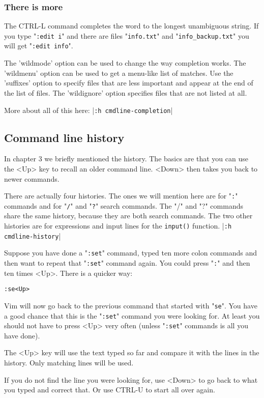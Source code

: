 \subsubsection{There is more}
The CTRL-L command completes the word to the longest unambiguous string.
If you type "\verb!:edit i!" and there are files "\verb!info.txt!" and "\verb!info_backup.txt!" you will get "\verb!:edit info!".

The 'wildmode' option can be used to change the way completion works.
The 'wildmenu' option can be used to get a menu-like list of matches.
Use the 'suffixes' option to specify files that are less important and appear at the end of the list of files.
The 'wildignore' option specifies files that are not listed at all.

More about all of this here: |\verb!:h cmdline-completion!|
\subsection{Command line history}
In chapter 3 we briefly mentioned the history.
The basics are that you can use the <Up> key to recall an older command line.
<Down> then takes you back to newer commands.

There are actually four histories.
The ones we will mention here are for "\verb!:!" commands and for "\verb!/!" and "\verb!?!" search commands.
The "/" and "?" commands share the same history, because they are both search commands.
The two other histories are for expressions and input lines for the \verb!input()! function.
|\verb!:h cmdline-history!|

Suppose you have done a "\verb!:set!" command, typed ten more colon commands and then want to repeat that "\verb!:set!" command again.
You could press "\verb!:!" and then ten times <Up>.
There is a quicker way:

\begin{Verbatim}[samepage=true]
 :se<Up>
\end{Verbatim}

Vim will now go back to the previous command that started with "\verb!se!".
You have a good chance that this is the "\verb!:set!" command you were looking for.
At least you should not have to press <Up> very often (unless "\verb!:set!" commands is all you have done).

The <Up> key will use the text typed so far and compare it with the lines in the history.
Only matching lines will be used.

If you do not find the line you were looking for, use <Down> to go back to what you typed and correct that.
Or use CTRL-U to start all over again.

